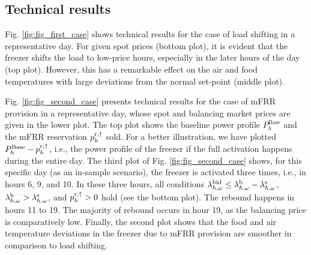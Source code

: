 \vspace{-2mm}
\subsection{Technical results}
Fig. \ref{fig:fig_first_case} shows technical results for the case of load shifting in a representative day. For given spot prices (bottom plot), it is evident that the freezer shifts the load to low-price hours, especially in the later hours of the day (top plot). However, this has a remarkable effect on the air and food temperatures with large deviations from the normal set-point (middle plot).


Fig. \ref{fig:fig_second_case} presents technical results for the case of mFRR  provision  in a representative day, whose spot and balancing market prices are given in the lower plot. The top plot shows the baseline power profile $P^{\text{Base}}_{h}$ and the mFRR reservation $p^{\rm{r}, \uparrow}_{h}$ sold. For a better illustration, we have plotted $P^{\text{Base}}_{h}-p^{\rm{r}, \uparrow}_{h}$, i.e., the power profile of the freezer if the full activation happens during the entire day. The third  plot of Fig. \ref{fig:fig_second_case} shows, for this specific day (as an in-sample scenario), the freezer is activated three times, i.e., in hours 6, 9, and 10. In these three hours, all conditions $\lambda_{h,\omega}^{\rm{bid}} \leq  \lambda_{h,\omega}^{\rm{b}} - \lambda_{h,\omega}^{\rm{s}}$, $ \lambda_{h,\omega}^{\rm{b}} > \lambda_{h,\omega}^{\rm{s}}$, and $p^{\rm{r},\uparrow}_{h} > 0$ hold (see the bottom plot). The rebound  happens in hours 11 to 19. The majority of rebound occurs in hour 19, as the balancing price is comparatively low. Finally, the second plot shows that the food and air temperature deviations in the freezer due to mFRR  provision  are smoother in comparison to  load shifting.



